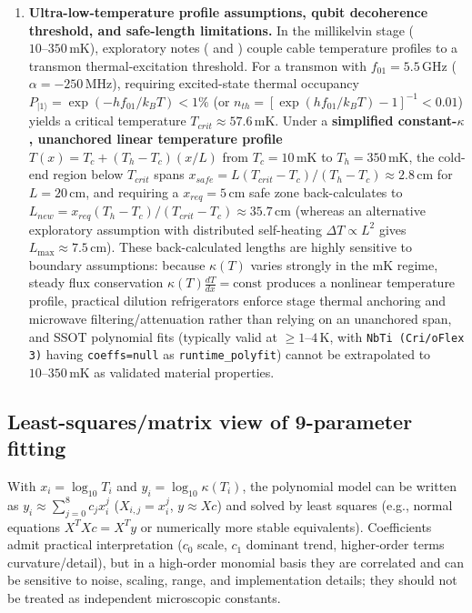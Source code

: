 \documentclass[11pt,a4paper]{article}
\begin{document}
\begin{enumerate}[leftmargin=*]
\item \textbf{Ultra-low-temperature profile assumptions, qubit decoherence threshold, and safe-length limitations.} In the millikelvin stage ($10\text{--}350\,\mathrm{mK}$), exploratory notes ( and ) couple cable temperature profiles to a transmon thermal-excitation threshold. For a transmon with $f_{01}=5.5\,\mathrm{GHz}$ ($\alpha=-250\,\mathrm{MHz}$), requiring excited-state thermal occupancy $P_{|1\rangle}=\exp(-hf_{01}/k_B T)<1\%$ (or $n_{th}=[\exp(hf_{01}/k_B T)-1]^{-1}<0.01$) yields a critical temperature $T_{crit}\approx 57.6\,\mathrm{mK}$. Under a \textbf{simplified constant-$\kappa$, unanchored linear temperature profile} $T(x)=T_c+(T_h-T_c)(x/L)$ from $T_c=10\,\mathrm{mK}$ to $T_h=350\,\mathrm{mK}$, the cold-end region below $T_{crit}$ spans $x_{safe}=L(T_{crit}-T_c)/(T_h-T_c)\approx 2.8\,\mathrm{cm}$ for $L=20\,\mathrm{cm}$, and requiring a $x_{req}=5\,\mathrm{cm}$ safe zone back-calculates to $L_{new}=x_{req}(T_h-T_c)/(T_{crit}-T_c)\approx 35.7\,\mathrm{cm}$ (whereas an alternative exploratory assumption with distributed self-heating $\Delta T\propto L^2$ gives $L_{\max}\approx 7.5\,\mathrm{cm}$). These back-calculated lengths are highly sensitive to boundary assumptions: because $\kappa(T)$ varies strongly in the mK regime, steady flux conservation $\kappa(T)\frac{dT}{dx}=\mathrm{const}$ produces a nonlinear temperature profile, practical dilution refrigerators enforce stage thermal anchoring and microwave filtering/attenuation rather than relying on an unanchored span, and SSOT polynomial fits (typically valid at $\ge 1\text{--}4\,\mathrm{K}$, with \texttt{NbTi (Cri/oFlex 3)} having \texttt{coeffs=null} as \texttt{runtime\_polyfit}) cannot be extrapolated to $10\text{--}350\,\mathrm{mK}$ as validated material properties.
\end{enumerate}

\subsection{Least-squares/matrix view of 9-parameter fitting}
With $x_i=\log_{10}T_i$ and $y_i=\log_{10}\kappa(T_i)$, the polynomial model can be written as $y_i \approx \sum_{j=0}^{8} c_j x_i^j$ ($X_{i,j}=x_i^j$, $y\approx Xc$) and solved by least squares (e.g., normal equations $X^T X c = X^T y$ or numerically more stable equivalents). Coefficients admit practical interpretation ($c_0$ scale, $c_1$ dominant trend, higher-order terms curvature/detail), but in a high-order monomial basis they are correlated and can be sensitive to noise, scaling, range, and implementation details; they should not be treated as independent microscopic constants.
\end{document}
